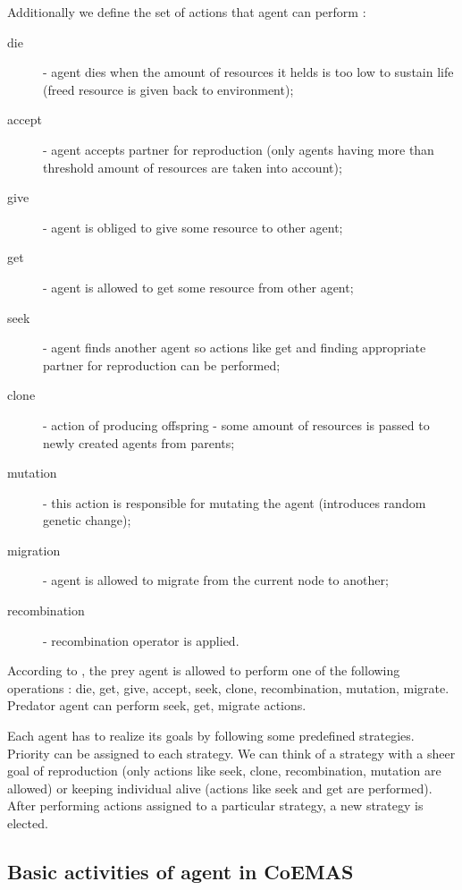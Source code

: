 Additionally we define the set of actions that agent can perform :

\begin{description}
  \item [die]
      - agent dies when the amount of resources it helds is too low to sustain life (freed resource is given back to environment);
  \item [accept]
      - agent accepts partner for reproduction (only agents having more than threshold amount of resources are taken into account);
  \item [give]
      - agent is obliged to give some resource to other agent;
  \item [get]
      - agent is allowed to get some resource from other agent;
  \item [seek]
      - agent finds another agent so actions like get and finding appropriate partner for reproduction can be performed;
  \item [clone]
      - action of producing offspring - some amount of resources is passed to newly created agents from parents;
  \item [mutation]
      - this action is responsible for mutating the agent (introduces random genetic change);
  \item [migration]
      - agent is allowed to migrate from the current node to another;
  \item [recombination]
      - recombination operator is applied.

\end{description}


According to \cite{Dre}, the prey agent is allowed to perform one of the following operations : die, get, give, accept, seek, clone, recombination, mutation,
 migrate. Predator agent can perform seek, get, migrate actions.

Each agent has to realize its goals by following some predefined strategies.
Priority can be assigned to each strategy.
We can think of a strategy with a sheer goal of reproduction (only actions like seek, clone, recombination, mutation are allowed) or keeping individual alive
(actions like seek and get are performed).
After performing actions assigned to a particular strategy, a new strategy is elected. 

\subsection{Basic activities of agent in CoEMAS}

